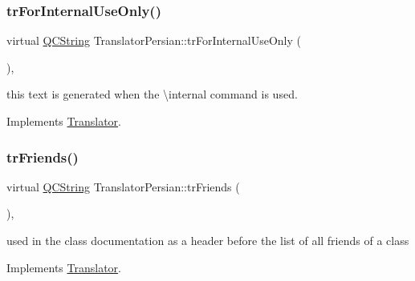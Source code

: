 \mbox{\label{class_translator_persian_a6a046e61fe1d49e488ea4abe006d178b}} 
\subsubsection{\texorpdfstring{trForInternalUseOnly()}{trForInternalUseOnly()}}
{\footnotesize\ttfamily virtual \mbox{\hyperlink{class_q_c_string}{Q\+C\+String}} Translator\+Persian\+::tr\+For\+Internal\+Use\+Only (\begin{DoxyParamCaption}{ }\end{DoxyParamCaption})\hspace{0.3cm}{\ttfamily [inline]}, {\ttfamily [virtual]}}

this text is generated when the \textbackslash{}internal command is used. 

Implements \mbox{\hyperlink{class_translator}{Translator}}.

\mbox{\label{class_translator_persian_a84f30dd24c444b4392ac46eeaf5da3d1}} 
\subsubsection{\texorpdfstring{trFriends()}{trFriends()}}
{\footnotesize\ttfamily virtual \mbox{\hyperlink{class_q_c_string}{Q\+C\+String}} Translator\+Persian\+::tr\+Friends (\begin{DoxyParamCaption}{ }\end{DoxyParamCaption})\hspace{0.3cm}{\ttfamily [inline]}, {\ttfamily [virtual]}}

used in the class documentation as a header before the list of all friends of a class 

Implements \mbox{\hyperlink{class_translator}{Translator}}.

\mbox{\label{class_translator_persian_a0f697beb0a1f01e3ffeec7c6ba60b52a}} 
